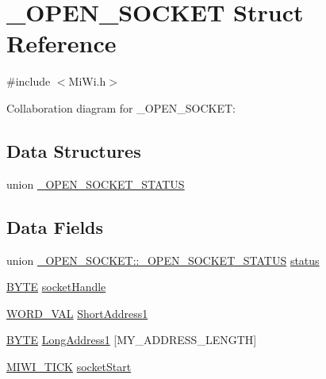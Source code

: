 \hypertarget{struct___o_p_e_n___s_o_c_k_e_t}{}\section{\+\_\+\+O\+P\+E\+N\+\_\+\+S\+O\+C\+K\+E\+T Struct Reference}
\label{struct___o_p_e_n___s_o_c_k_e_t}


{\ttfamily \#include $<$Mi\+Wi.\+h$>$}



Collaboration diagram for \+\_\+\+O\+P\+E\+N\+\_\+\+S\+O\+C\+K\+E\+T\+:
\subsection*{Data Structures}
\begin{DoxyCompactItemize}
\item 
union \hyperlink{union___o_p_e_n___s_o_c_k_e_t_1_1___o_p_e_n___s_o_c_k_e_t___s_t_a_t_u_s}{\+\_\+\+O\+P\+E\+N\+\_\+\+S\+O\+C\+K\+E\+T\+\_\+\+S\+T\+A\+T\+U\+S}
\end{DoxyCompactItemize}
\subsection*{Data Fields}
\begin{DoxyCompactItemize}
\item 
union \hyperlink{union___o_p_e_n___s_o_c_k_e_t_1_1___o_p_e_n___s_o_c_k_e_t___s_t_a_t_u_s}{\+\_\+\+O\+P\+E\+N\+\_\+\+S\+O\+C\+K\+E\+T\+::\+\_\+\+O\+P\+E\+N\+\_\+\+S\+O\+C\+K\+E\+T\+\_\+\+S\+T\+A\+T\+U\+S} \hyperlink{struct___o_p_e_n___s_o_c_k_e_t_a7d0a0f277b2cbee445cb7c84b77fb304}{status}
\item 
\hyperlink{_generic_type_defs_8h_a4ae1dab0fb4b072a66584546209e7d58}{B\+Y\+T\+E} \hyperlink{struct___o_p_e_n___s_o_c_k_e_t_a63a91174ab437f2a442960ea2891587d}{socket\+Handle}
\item 
\hyperlink{union_w_o_r_d___v_a_l}{W\+O\+R\+D\+\_\+\+V\+A\+L} \hyperlink{struct___o_p_e_n___s_o_c_k_e_t_ac4a41c63bb7eef54536bb7a876d788cb}{Short\+Address1}
\item 
\hyperlink{_generic_type_defs_8h_a4ae1dab0fb4b072a66584546209e7d58}{B\+Y\+T\+E} \hyperlink{struct___o_p_e_n___s_o_c_k_e_t_a33b58a55eb636e80eeeae13b6cebca4b}{Long\+Address1} \mbox{[}M\+Y\+\_\+\+A\+D\+D\+R\+E\+S\+S\+\_\+\+L\+E\+N\+G\+T\+H\mbox{]}
\item 
\hyperlink{_symbol_time_8h_aa0f8e40665d4ca8eb3e8f91e9e85c323}{M\+I\+W\+I\+\_\+\+T\+I\+C\+K} \hyperlink{struct___o_p_e_n___s_o_c_k_e_t_a70db9c66af172a2bc0d47a4bec086049}{socket\+Start}
\end{DoxyCompactItemize}


